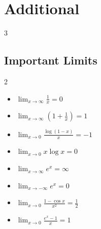\section{Additional}

\setlength{\tabcolsep}{2pt}
\renewcommand{\arraystretch}{1.04}

\begin{multicols*}{3}

\subsection*{Important Limits}

\begin{multicols}{2}
\begin{itemize}[noitemsep, topsep=0pt, leftmargin=*]
\item $\lim_{x\to\infty}\frac1x=0$
\item $\lim_{x\to\infty}\left(1+\frac1x\right)=1$
\item $\lim_{x\to0}\frac{\log(1-x)}x=-1$
\item $\lim_{x\to0}x\log x=0$

\item $\lim_{x\to\infty}e^x=\infty$
\item $\lim_{x\to-\infty}e^x=0$
\item $\lim_{x\to0}\frac{1-\cos x}{x^2}=\frac12$
\item $\lim_{x\to0}\frac{e^x-1}{x}=1$


\end{itemize}
\end{multicols}
\end{multicols*}
